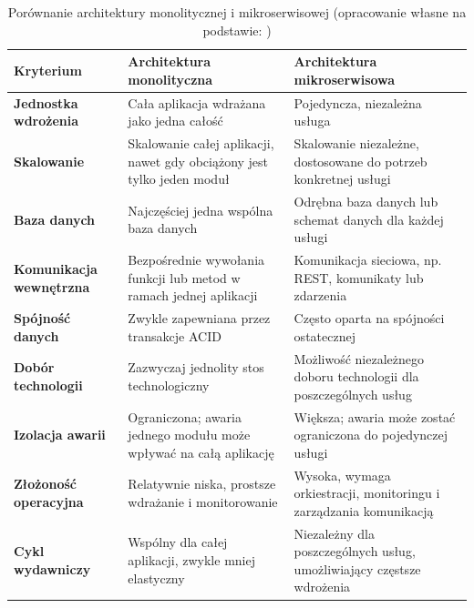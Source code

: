 \begin{table}[H]
    \centering
    \caption{Porównanie architektury monolitycznej i mikroserwisowej 
    (opracowanie własne na podstawie: \cite{newman2021,richardson2018})}
    \label{tab:monolit-vs-mikroserwisy}
    \renewcommand{\arraystretch}{1.25}
    \setlength{\tabcolsep}{8pt}

    \begin{tabularx}{\textwidth}{>{\raggedright\arraybackslash\bfseries}p{3.4cm}
                                    >{\raggedright\arraybackslash}X
                                    >{\raggedright\arraybackslash}X}
        \toprule
        \textbf{Kryterium} 
        & \textbf{Architektura monolityczna} 
        & \textbf{Architektura mikroserwisowa} \\
        \midrule

        Jednostka wdrożenia 
        & Cała aplikacja wdrażana jako jedna całość 
        & Pojedyncza, niezależna usługa \\

        Skalowanie 
        & Skalowanie całej aplikacji, nawet gdy obciążony jest tylko jeden moduł 
        & Skalowanie niezależne, dostosowane do potrzeb konkretnej usługi \\

        Baza danych 
        & Najczęściej jedna wspólna baza danych 
        & Odrębna baza danych lub schemat danych dla każdej usługi \\

        Komunikacja wewnętrzna 
        & Bezpośrednie wywołania funkcji lub metod w ramach jednej aplikacji 
        & Komunikacja sieciowa, np. REST, komunikaty lub zdarzenia \\

        Spójność danych 
        & Zwykle zapewniana przez transakcje ACID 
        & Często oparta na spójności ostatecznej \\

        Dobór technologii 
        & Zazwyczaj jednolity stos technologiczny 
        & Możliwość niezależnego doboru technologii dla poszczególnych usług \\

        Izolacja awarii 
        & Ograniczona; awaria jednego modułu może wpływać na całą aplikację 
        & Większa; awaria może zostać ograniczona do pojedynczej usługi \\

        Złożoność operacyjna 
        & Relatywnie niska, prostsze wdrażanie i monitorowanie 
        & Wysoka, wymaga orkiestracji, monitoringu i zarządzania komunikacją \\

        Cykl wydawniczy 
        & Wspólny dla całej aplikacji, zwykle mniej elastyczny 
        & Niezależny dla poszczególnych usług, umożliwiający częstsze wdrożenia \\

        \bottomrule
    \end{tabularx}
\end{table}

